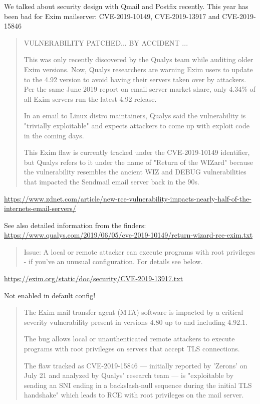 \documentclass[Screen16to9,17pt]{foils}
\begin{document}
We talked about security design with Qmail and Postfix recently. This year has been bad for Exim mailserver: CVE-2019-10149, CVE-2019-13917 and CVE-2019-15846


\begin{quote}
  VULNERABILITY PATCHED... BY ACCIDENT
...

This was only recently discovered by the Qualys team while auditing older Exim versions. Now, Qualys researchers are warning Exim users to update to the 4.92 version to avoid having their servers taken over by attackers. Per the same June 2019 report on email server market share, only 4.34\% of all Exim servers run the latest 4.92 release.

In an email to Linux distro maintainers, Qualys said the vulnerability is "trivially exploitable" and expects attackers to come up with exploit code in the coming days.

This Exim flaw is currently tracked under the CVE-2019-10149 identifier, but Qualys refers to it under the name of "Return of the WIZard" because the vulnerability resembles the ancient WIZ and DEBUG vulnerabilities that impacted the Sendmail email server back in the 90s.
\end{quote}

{\footnotesize\url{https://www.zdnet.com/article/new-rce-vulnerability-impacts-nearly-half-of-the-internets-email-servers/}}

See also detailed information from the finders:\\ \url{https://www.qualys.com/2019/06/05/cve-2019-10149/return-wizard-rce-exim.txt}



\begin{quote}
Issue:      A local or remote attacker can execute programs with root
            privileges - if you've an unusual configuration. For details
	    see below.
\end{quote}

\url{https://exim.org/static/doc/security/CVE-2019-13917.txt}

Not enabled in default config!


\begin{quote}
The Exim mail transfer agent (MTA) software is impacted by a critical severity vulnerability present in versions 4.80 up to and including 4.92.1.

The bug allows local or unauthenticated remote attackers to execute programs with root privileges on servers that accept TLS connections.

The flaw tracked as CVE-2019-15846 — initially reported by 'Zerons' on July 21 and analyzed by Qualys' research team — is "exploitable by sending an SNI ending in a backslash-null sequence during the initial TLS handshake" which leads to RCE with root privileges on the mail server.
\end{quote}
\end{document}
